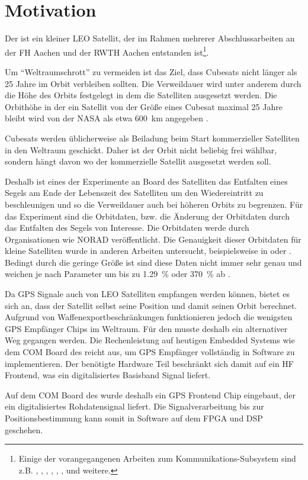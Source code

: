 \section{Motivation}
Der \dscubesat ist ein kleiner \gls{LEO} Satellit, der im Rahmen mehrerer Abschlussarbeiten an der FH Aachen und der RWTH Aachen entstanden ist\footnote{Einige der vorangegangenen Arbeiten zum Kommunikations-Subsystem sind z.B. \cite{DragsailKaiMA}, \cite{DragsailRalfMA}, \cite{DragsailAndrejMA},
\cite{DragsailUweMAGroundDataHandling}, \cite{DragsailVolkerMACommstandard}, \cite{DragsailGeorgMAGroundSDR}, \cite{DragsailNeelamMAGroundDSP} und weitere.}.

Um \enquote{Weltraumschrott} zu vermeiden ist das Ziel, dass Cubesats nicht länger als 25 Jahre im Orbit verbleiben sollten. Die Verweildauer wird unter anderem durch die Höhe des Orbits festgelegt in dem die Satelliten ausgesetzt werden. Die Orbithöhe in der ein  Satellit von der Größe eines Cubesat maximal 25 Jahre bleibt wird von der NASA als etwa \SI{600}{\kilo\meter} angegeben \cite{NASAOrbitalDebris}.

Cubesats werden üblicherweise als Beiladung beim Start kommerzieller Satelliten in den Weltraum geschickt. Daher ist der Orbit nicht beliebig frei wählbar, sondern hängt davon wo der kommerzielle Satellit ausgesetzt werden soll.

Deshalb ist eines der Experimente an Board des Satelliten das Entfalten eines Segels am Ende der Lebenszeit des Satelliten um den Wiedereintritt zu beschleunigen und so die Verweildauer auch bei höheren Orbits zu begrenzen. Für das Experiment sind die Orbitdaten, bzw. die Änderung der Orbitdaten durch das Entfalten des Segels von Interesse. Die Orbitdaten werde durch Organisationen wie NORAD veröffentlicht. Die Genauigkeit dieser Orbitdaten für kleine Satelliten wurde in anderen Arbeiten untersucht, beispielsweise in \cite{TLEAccuracyKahr} oder \cite{TLEAccuracyDoyle}. Bedingt durch die geringe Größe ist sind diese Daten nicht immer sehr genau und weichen je nach Parameter um bis zu \SI{1.29}{\percent} oder \SI{370}{\percent} ab \cite{TLEAccuracyDoyle}.

Da GPS Signale auch von \gls{LEO} Satelliten empfangen werden können, bietet es sich an, dass der Satellit selbst seine Position und damit seinen Orbit berechnet. Aufgrund von Waffenexportbeschränkungen funktionieren jedoch die wenigsten GPS Empfänger Chips im Weltraum. Für den \dscubesat musste deshalb ein alternativer Weg gegangen werden. Die Rechenleistung auf heutigen Embedded Systems wie dem COM Board des \dscubesat reicht aus, um GPS Empfänger vollständig in Software zu implementieren. Der benötigte Hardware Teil beschränkt sich damit auf ein HF Frontend, was ein digitalisiertes Basisband Signal liefert.

Auf dem COM Board des \dscubesat wurde deshalb ein GPS Frontend Chip eingebaut, der ein digitalisiertes Rohdatensignal liefert. Die Signalverarbeitung bis zur Positionsbestimmung kann somit in Software auf dem FPGA und DSP geschehen.